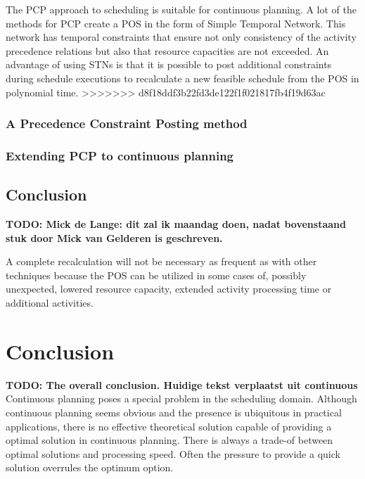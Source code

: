 \documentclass{article}
\newcommand{\TODO}[1]{{\color{red}\textbf{TODO: #1}}}
\begin{document}
The PCP approach to scheduling is suitable for continuous planning. A lot of the methods for PCP create a POS in the form of Simple Temporal Network. This network has temporal constraints that ensure not only consistency of the activity precedence relations but also that resource capacities are not exceeded. An advantage of using STNs is that it is possible to post additional constraints during schedule executions to recalculate a new feasible schedule from the POS in polynomial time. 
>>>>>>> d8f18ddf3b22fd3de122f1f021817fb4f19d63ac

\subsubsection{A Precedence Constraint Posting method}

\subsubsection{Extending PCP to continuous planning}

\subsection{Conclusion}
\TODO{Mick de Lange: dit zal ik maandag doen, nadat bovenstaand stuk door Mick van Gelderen is geschreven.}

A complete recalculation will not be necessary as frequent as with other techniques because the POS can be utilized in some cases of, possibly unexpected, lowered resource capacity, extended activity processing time or additional activities. 

\section{Conclusion}
\TODO{The overall conclusion. Huidige tekst verplaatst uit continuous}
Continuous planning poses a special problem in the scheduling domain.
Although continuous planning seems obvious and the presence is ubiquitous in practical applications, there is no effective theoretical solution capable of providing a optimal solution in continuous planning.
There is always a trade-of between optimal solutions and processing speed.
Often the pressure to provide a quick solution overrules the optimum option.



\end{document}
